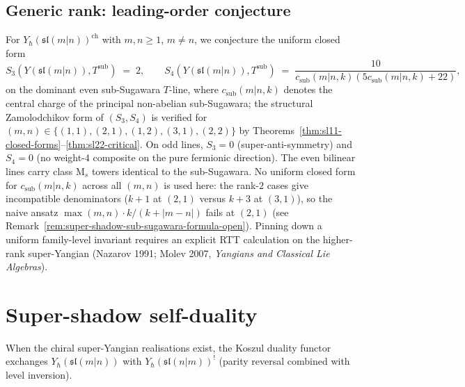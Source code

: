 \subsection{Generic rank: leading-order conjecture}
\label{sec:super-riccati-generic-rank}

\begin{remark}
\label{rem:super-riccati-generic-rank-conjecture}
For $Y_\hbar(\mathfrak{sl}(m|n))^{\mathrm{ch}}$ with $m, n \ge 1$,
$m \ne n$, we conjecture the uniform closed form
\[
S_3(Y(\mathfrak{sl}(m|n)), T^{\mathrm{sub}}) \;=\; 2,
\qquad
S_4(Y(\mathfrak{sl}(m|n)), T^{\mathrm{sub}})
 \;=\; \frac{10}{c_{\mathrm{sub}}(m|n, k)(5 c_{\mathrm{sub}}(m|n, k) + 22)},
\]
on the dominant even sub-Sugawara $T$-line, where
$c_{\mathrm{sub}}(m|n, k)$ denotes the central charge of the principal
non-abelian sub-Sugawara; the structural Zamolodchikov form of
$(S_3, S_4)$ is verified for $(m, n) \in \{(1,1), (2,1), (1,2),
(3,1), (2,2)\}$ by Theorems~\ref{thm:sl11-closed-forms}--\ref{thm:sl22-critical}.
On odd lines, $S_3 = 0$ (super-anti-symmetry) and $S_4 = 0$ (no
weight-$4$ composite on the pure fermionic direction). The even
bilinear lines carry class M$_s$ towers identical to the sub-Sugawara.
No uniform closed form for $c_{\mathrm{sub}}(m|n, k)$ across all
$(m, n)$ is used here: the rank-$2$ cases give incompatible
denominators ($k + 1$ at $(2, 1)$ versus $k + 3$ at $(3, 1)$), so the
naive ansatz $\max(m, n) \cdot k/(k + |m - n|)$ fails at $(2, 1)$
(see Remark~\ref{rem:super-shadow-sub-sugawara-formula-open}).
Pinning down a uniform family-level invariant requires an explicit
RTT calculation on the higher-rank super-Yangian (Nazarov 1991;
Molev 2007, \emph{Yangians and Classical Lie Algebras}).
\end{remark}

\section{Super-shadow self-duality}
\label{sec:super-riccati-selfduality}

When the chiral super-Yangian realisations exist, the Koszul duality
functor exchanges $Y_\hbar(\mathfrak{sl}(m|n))$ with
$Y_\hbar(\mathfrak{sl}(n|m))^!$ (parity reversal combined with level
inversion).


